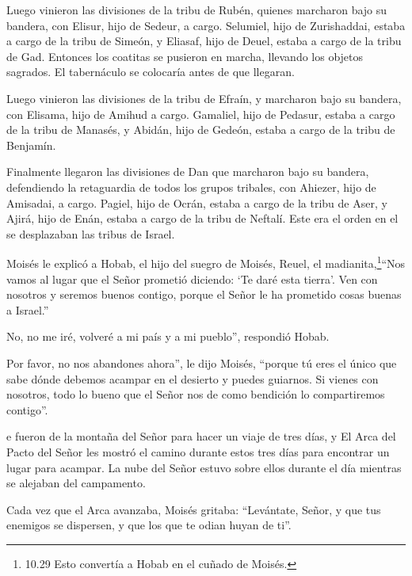  Luego vinieron las divisiones de la tribu de Rubén,
quienes marcharon bajo su bandera, con Elisur, hijo de Sedeur, a cargo.
 Selumiel, hijo de Zurishaddai, estaba a cargo de la tribu
de Simeón,  y Eliasaf, hijo de Deuel, estaba a cargo de la
tribu de Gad.  Entonces los coatitas se pusieron en marcha,
llevando los objetos sagrados. El tabernáculo se colocaría antes de que
llegaran.

 Luego vinieron las divisiones de la tribu de Efraín, y
marcharon bajo su bandera, con Elisama, hijo de Amihud a cargo.
 Gamaliel, hijo de Pedasur, estaba a cargo de la tribu de
Manasés,  y Abidán, hijo de Gedeón, estaba a cargo de la
tribu de Benjamín.

 Finalmente llegaron las divisiones de Dan que marcharon
bajo su bandera, defendiendo la retaguardia de todos los grupos
tribales, con Ahiezer, hijo de Amisadai, a cargo.  Pagiel,
hijo de Ocrán, estaba a cargo de la tribu de Aser,  y
Ajirá, hijo de Enán, estaba a cargo de la tribu de Neftalí.
 Este era el orden en el se desplazaban las tribus de
Israel.

 Moisés le explicó a Hobab, el hijo del suegro de Moisés,
Reuel, el madianita,\footnote{10.29 Esto convertía a Hobab en el cuñado
  de Moisés.}``Nos vamos al lugar que el Señor prometió diciendo: `Te
daré esta tierra'. Ven con nosotros y seremos buenos contigo, porque el
Señor le ha prometido cosas buenas a Israel.''

 No, no me iré, volveré a mi país y a mi pueblo'',
respondió Hobab.

 Por favor, no nos abandones ahora'', le dijo Moisés,
``porque tú eres el único que sabe dónde debemos acampar en el desierto
y puedes guiarnos.  Si vienes con nosotros, todo lo bueno
que el Señor nos de como bendición lo compartiremos contigo''.

 e fueron de la montaña del Señor para hacer un viaje de
tres días, y El Arca del Pacto del Señor les mostró el camino durante
estos tres días para encontrar un lugar para acampar.  La
nube del Señor estuvo sobre ellos durante el día mientras se alejaban
del campamento.

 Cada vez que el Arca avanzaba, Moisés gritaba:
``Levántate, Señor, y que tus enemigos se dispersen, y que los que te
odian huyan de ti''.

